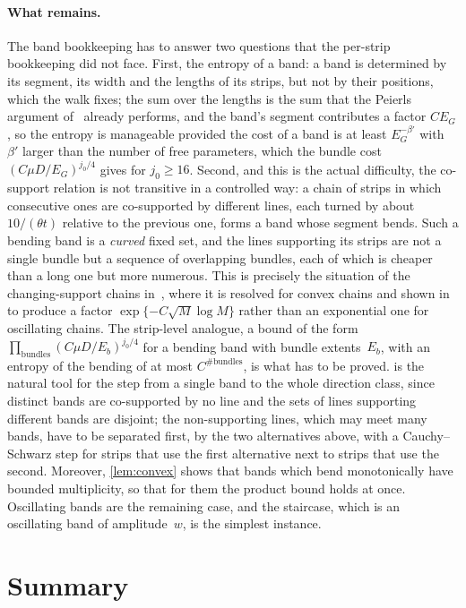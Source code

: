 \documentclass[11pt,letterpaper]{article}
\begin{document}
\paragraph{What remains.} The band bookkeeping has to answer two questions that the per-strip bookkeeping did not face. First, the entropy of a band: a band is determined by its segment, its width and the lengths of its strips, but not by their positions, which the walk fixes; the sum over the lengths is the sum that the Peierls argument of~\cite[Section~3]{SC26} already performs, and the band's segment contributes a factor $CE_G$, so the entropy is manageable provided the cost of a band is at least $E_G^{-\beta'}$ with $\beta'$ larger than the number of free parameters, which the bundle cost $(C\mu D/E_G)^{j_0/4}$ gives for $j_0\ge16$. Second, and this is the actual difficulty, the co-support relation is not transitive in a controlled way: a chain of strips in which consecutive ones are co-supported by different lines, each turned by about $10/(\theta t)$ relative to the previous one, forms a band whose segment bends. Such a bending band is a \emph{curved} fixed set, and the lines supporting its strips are not a single bundle but a sequence of overlapping bundles, each of which is cheaper than a long one but more numerous. This is precisely the situation of the changing-support chains in~\cite{CS26}, where it is resolved for convex chains and shown in~\cite{OSC26} to produce a factor $\exp\{-C\sqrt M\log M\}$ rather than an exponential one for oscillating chains. The strip-level analogue, a bound of the form $\prod_{\text{bundles}}(C\mu D/E_b)^{j_0/4}$ for a bending band with bundle extents~$E_b$, with an entropy of the bending of at most $C^{\#\text{bundles}}$, is what has to be proved.  is the natural tool for the step from a single band to the whole direction class, since distinct bands are co-supported by no line and the sets of lines supporting different bands are disjoint; the non-supporting lines, which may meet many bands, have to be separated first, by the two alternatives above, with a Cauchy--Schwarz step for strips that use the first alternative next to strips that use the second. Moreover, \cref{lem:convex} shows that bands which bend monotonically have bounded multiplicity, so that for them the product bound holds at once. Oscillating bands are the remaining case, and the staircase, which is an oscillating band of amplitude~$w$, is the simplest instance.

\section{Summary}
\label{sec:summary}
\end{document}
